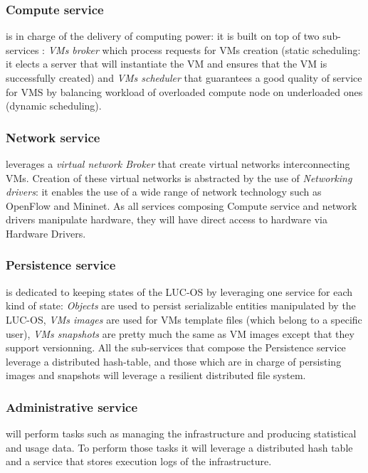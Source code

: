 \subsubsection{Compute service}
is in charge of the delivery of computing power: it is built on top of two 
sub-services : \emph{VMs broker} which process requests for VMs creation (static
scheduling: it elects a server that will instantiate the VM and ensures that the
VM is successfully created) and \emph{VMs scheduler} that guarantees a good 
quality of service for VMS by balancing workload of overloaded compute node on
underloaded ones (dynamic scheduling). 

\subsubsection{Network service} 
leverages a \emph{virtual network Broker} that create virtual networks 
interconnecting VMs. Creation of these virtual networks is abstracted by the use
of \emph{Networking drivers}: it enables the use of a wide range of network 
technology such as OpenFlow and Mininet. As all services composing Compute 
service and network drivers manipulate hardware, they will have direct access to
hardware via Hardware Drivers. 

\subsubsection{Persistence service}
is dedicated to keeping states of the LUC-OS by leveraging one service for each
kind of state: \emph{Objects} are used to persist serializable entities 
manipulated by the LUC-OS, \emph{VMs images} are used for VMs template files 
(which belong to a specific user), \emph{VMs snapshots} are pretty much the same
as VM images except that they support versionning. All the sub-services that 
compose the Persistence service leverage a distributed hash-table, and those 
which are in charge of persisting images and snapshots will leverage a resilient 
distributed file system. 

\subsubsection{Administrative service} 
will perform tasks such as managing the infrastructure and producing statistical
and usage data. To perform those tasks it will leverage a distributed hash table
and a service that stores execution logs of the infrastructure.




